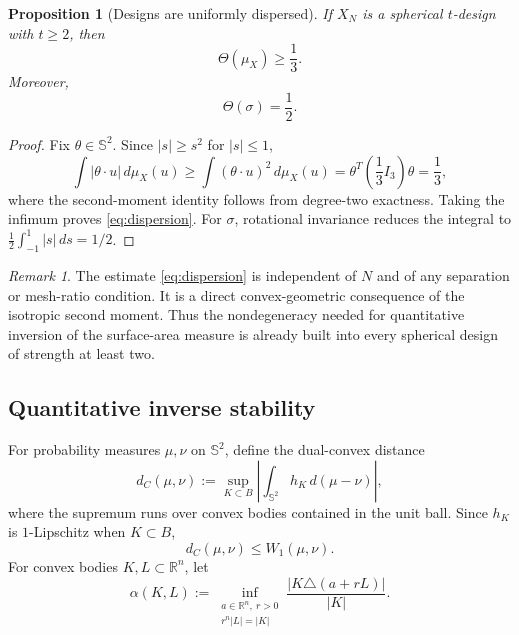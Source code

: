 \documentclass[11pt]{article}
\newtheorem{proposition}[theorem]{Proposition}
\theoremstyle{definition}
\theoremstyle{remark}
\newtheorem{remark}[theorem]{Remark}
\newcommand{\Sph}{\mathbb S}
\newcommand{\R}{\mathbb R}
\begin{document}
\begin{proposition}[Designs are uniformly dispersed]\label{prop:dispersion}
If $X_N$ is a spherical $t$-design with $t\ge2$, then
\begin{equation}\label{eq:dispersion}
\Theta(\mu_X)\ge\frac13.
\end{equation}
Moreover,
\[
\Theta(\sigma)=\frac12.
\]
\end{proposition}

\begin{proof}
Fix $\theta\in\Sph^2$. Since $|s|\ge s^2$ for $|s|\le1$,
\[
\int|\theta\cdot u|\,d\mu_X(u)
\ge\int(\theta\cdot u)^2\,d\mu_X(u)
=\theta^T\left(\frac13I_3\right)\theta
=\frac13,
\]
where the second-moment identity follows from degree-two exactness. Taking the infimum proves \eqref{eq:dispersion}. For $\sigma$, rotational invariance reduces the integral to $\frac12\int_{-1}^1|s|\,ds=1/2$.
\end{proof}

\begin{remark}\label{rem:dispersion-universal}
The estimate \eqref{eq:dispersion} is independent of $N$ and of any separation or mesh-ratio condition. It is a direct convex-geometric consequence of the isotropic second moment. Thus the nondegeneracy needed for quantitative inversion of the surface-area measure is already built into every spherical design of strength at least two.
\end{remark}

\subsection{Quantitative inverse stability}
For probability measures $\mu,\nu$ on $\Sph^2$, define the dual-convex distance
\begin{equation}\label{eq:dc}
d_C(\mu,\nu):=\sup_{K\subset B}\left|\int_{\Sph^2}h_K\,d(\mu-\nu)\right|,
\end{equation}
where the supremum runs over convex bodies contained in the unit ball. Since $h_K$ is $1$-Lipschitz when $K\subset B$,
\begin{equation}\label{eq:dc-w1}
d_C(\mu,\nu)\le W_1(\mu,\nu).
\end{equation}
For convex bodies $K,L\subset\R^n$, let
\begin{equation}\label{eq:fraenkel}
\alpha(K,L):=\inf_{\substack{a\in\R^n,\ r>0\\ r^n|L|=|K|}}
\frac{|K\triangle(a+rL)|}{|K|}.
\end{equation}
\end{document}
